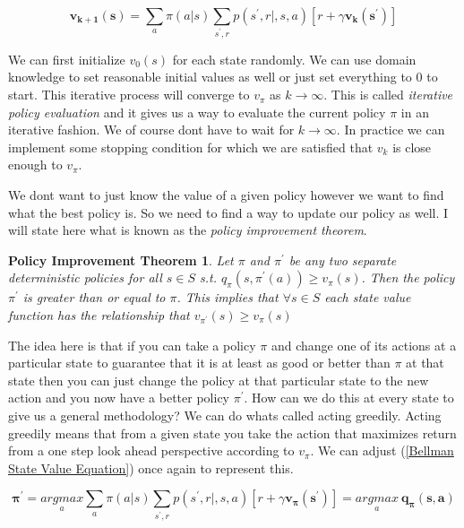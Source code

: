 \begin{equation}\label{Bellman State Value Update Equation}
\mathbf{v_{k + 1}(s)} = \underset{a}{\sum}\pi(a|s)\underset{s^{'},r}{\sum}p(s^{'},r|,s,a)[ r + \gamma \mathbf{v_{k}(s^{'})}]
\end{equation}

We can first initialize $v_{0}(s)$ for each state randomly. We can use domain knowledge to set reasonable initial values as well or just set everything to 0 to start. This iterative process will converge to $v_{\pi}$ as $ k \rightarrow \infty$. This is called \textit{iterative policy evaluation} and it gives us a way to evaluate the current policy $\pi$ in an iterative fashion. We of course dont have to wait for $ k \rightarrow \infty$. In practice we can implement some stopping condition for which we are satisfied that $v_{k}$ is close enough to $v_{\pi}$. 

We dont want to just know the value of a given policy however we want to find what the best policy is. So we need to find a way to update our policy as well. I will state here what is known as the \textit{policy improvement theorem}. 

\newtheorem{remark}{Policy Improvement Theorem}

\begin{remark}\label{Policy Improvement Theorem}
Let $\pi$ and $\pi^{'}$ be any two separate deterministic policies for all $s \in S$ s.t. $q_{\pi}(s,\pi^{'}(a)) \geq v_{\pi}(s)$. Then the policy $\pi^{'}$ is greater than or equal to $\pi$. This implies that $ \forall s \in S$ each state value function has the relationship that $v_{\pi^{'}}(s) \geq v_{\pi}(s)$
\end{remark}

The idea here is that if you can take a policy $\pi$ and change one of its actions at a particular state to guarantee that it is at least as good or better than $\pi$ at that state then you can just change the policy at that particular state to the new action and you now have a better policy $\pi^{'}$. How can we do this at every state to give us a general methodology? We can do whats called acting greedily. Acting greedily means that from a given state you take the action that maximizes return from a one step look ahead perspective according to $v_{\pi}$. We can adjust (\ref{Bellman State Value Equation}) once again to represent this. 

\begin{equation}\label{Greedy Policy}
\mathbf{\pi^{'}} = \underset{a}{argmax}\underset{a}{\sum}\pi(a|s)\underset{s^{'},r}{\sum}p(s^{'},r|,s,a)[ r + \gamma \mathbf{v_{\pi}(s^{'})}] = \underset{a}{argmax} \: \mathbf{q_{\pi}(s,a)}
\end{equation}

